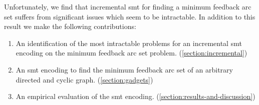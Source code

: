 Unfortunately, we find that incremental \ac{smt} for finding a minimum feedback
arc set suffers from significant issues which seem to be intractable. In
addition to this result we make the following contributions:
%
\begin{enumerate}
\item An identification of the most intractable problems for an incremental
  \ac{smt} encoding on the minimum feedback arc set problem.
  (\autoref{section:incremental})
\item An \ac{smt} encoding to find the minimum feedback arc set of an arbitrary
  directed and cyclic graph. (\autoref{section:gadgets})
\item An empirical evaluation of the \ac{smt} encoding.
  (\autoref{section:results-and-discussion})
\end{enumerate}



